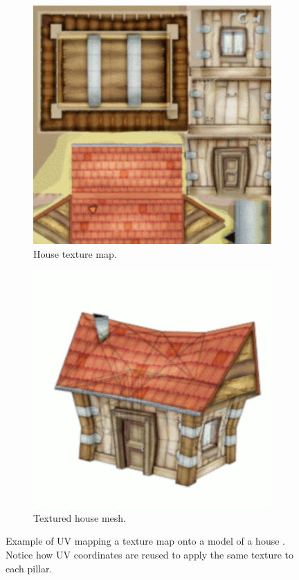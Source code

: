 \begin{figure}[h!]
  \centering
  \begin{subfigure}[b]{0.30\textwidth}
    \includegraphics[width=\textwidth]{figure/uv-mapping1.png}
    \caption{House texture map.}
  \end{subfigure}
  \quad
  \quad
  \quad
  \begin{subfigure}[b]{0.30\textwidth}
    \includegraphics[width=\textwidth]{figure/uv-mapping2.png}
    \caption{Textured house mesh.}
  \end{subfigure}

  \caption{Example of UV mapping a texture map onto a model of a house \cite{house_uv_mapping}. Notice how UV coordinates are reused to apply the same texture to each pillar.}
  \label{fig:uv-mapping}
\end{figure}

